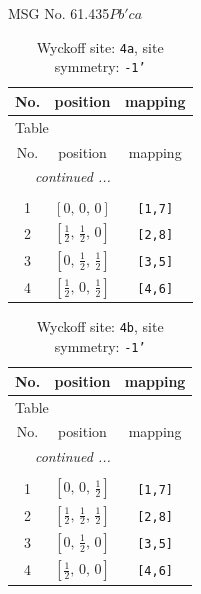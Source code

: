\documentclass[fleqn,8pt]{jsarticle}
\begin{document}
\setcounter{MaxMatrixCols}{32}

\renewcommand{\tablename}{Table~}
\renewcommand{\figurename}{Figure~}
\begin{center}
\LARGE
MSG No. 61.435\quad$Pb'ca$
\end{center}
\renewcommand{\arraystretch}{1.2}
\begin{longtable}{ccc}
\caption{Wyckoff site: {\tt 4a}, site symmetry: {\tt -1'}}
 \\
 \hline \hline
No. & position & mapping \\ \hline \endfirsthead

\multicolumn{2}{l}{\tablename\ \thetable{}} \\
 \hline \hline
No. & position & mapping \\ \hline \endhead

 \hline \hline
\multicolumn{2}{r}{\footnotesize\it continued ...} \\ \endfoot

 \hline \hline
\multicolumn{2}{r}{} \\ \endlastfoot

1 & $\left[ 0,\, 0,\, 0 \right]$ & {\tt [1,7]} \\ \hline
2 & $\left[ \frac{1}{2},\, \frac{1}{2},\, 0 \right]$ & {\tt [2,8]} \\ \hline
3 & $\left[ 0,\, \frac{1}{2},\, \frac{1}{2} \right]$ & {\tt [3,5]} \\ \hline
4 & $\left[ \frac{1}{2},\, 0,\, \frac{1}{2} \right]$ & {\tt [4,6]} \\
\end{longtable}
\renewcommand{\arraystretch}{1.2}
\begin{longtable}{ccc}
\caption{Wyckoff site: {\tt 4b}, site symmetry: {\tt -1'}}
 \\
 \hline \hline
No. & position & mapping \\ \hline \endfirsthead

\multicolumn{2}{l}{\tablename\ \thetable{}} \\
 \hline \hline
No. & position & mapping \\ \hline \endhead

 \hline \hline
\multicolumn{2}{r}{\footnotesize\it continued ...} \\ \endfoot

 \hline \hline
\multicolumn{2}{r}{} \\ \endlastfoot

1 & $\left[ 0,\, 0,\, \frac{1}{2} \right]$ & {\tt [1,7]} \\ \hline
2 & $\left[ \frac{1}{2},\, \frac{1}{2},\, \frac{1}{2} \right]$ & {\tt [2,8]} \\ \hline
3 & $\left[ 0,\, \frac{1}{2},\, 0 \right]$ & {\tt [3,5]} \\ \hline
4 & $\left[ \frac{1}{2},\, 0,\, 0 \right]$ & {\tt [4,6]} \\
\end{longtable}
\end{document}
